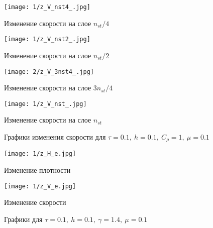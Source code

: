 \begin{figure}[h]
	\begin{minipage}[h]{0.47\linewidth}
		\centering
		\texttt{[image: 1/z\_V\_nst4\_.jpg]} 
		\caption{Изменение скорости на слое $n_{st} / 4$}
	\end{minipage}
	\hfill
	\begin{minipage}[h]{0.47\linewidth}
		\centering
		\texttt{[image: 1/z\_V\_nst2\_.jpg]} 
		\caption{Изменение скорости на слое $n_{st} / 2$}
	\end{minipage}
\end{figure}
\begin{figure}[h]
	\begin{minipage}[h]{0.47\linewidth}
		\centering
		\texttt{[image: 2/z\_V\_3nst4\_.jpg]} 
		\caption{Изменение скорости на слое $3n_{st} / 4$}
	\end{minipage}
	\hfill
	\begin{minipage}[h]{0.47\linewidth}
		\centering
		\texttt{[image: 1/z\_V\_nst\_.jpg]} 
		\caption{Изменение скорости на слое $n_{st}$}
	\end{minipage}
	\caption{Графики изменения скорости для $\tau = 0.1, \ h = 0.1, \ C_{\rho} = 1, \ \mu = 0.1$}
	\label{ris:experimentalcorrelationsignals}
\end{figure}

\begin{figure}[h]
	\centering
	\begin{minipage}[b]{0.49\linewidth}
		\centering
		\texttt{[image: 1/z\_H\_e.jpg]}  %
		\caption{Изменение плотности}
	\end{minipage}%
	\hfill
	\begin{minipage}[b]{0.49\linewidth}
		\centering
		\texttt{[image: 1/z\_V\_e.jpg]}  %
		\caption{Изменение скорости}
	\end{minipage}
	\caption{Графики для $\tau = 0.1, \ h = 0.1, \ \gamma = 1.4, \ \mu = 0.1$}
	\label{ris:images}
\end{figure}

